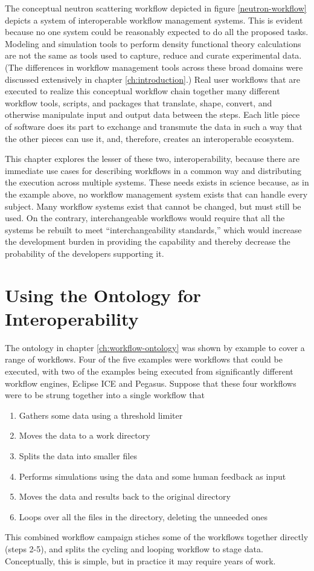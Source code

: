 The conceptual neutron scattering workflow depicted in figure
\ref{neutron-workflow} depicts a system of interoperable workflow management
systems. This is evident because no one system could be reasonably expected to
do all the proposed tasks. Modeling and simulation tools to perform density
functional theory calculations are not the same as tools used to capture, reduce
and curate experimental data. (The differences in workflow management tools
across these broad domains were discussed extensively in chapter
\ref{ch:introduction}.) Real user workflows that are executed to realize this
conceptual workflow chain together many different workflow tools, scripts, and
packages that translate, shape, convert, and otherwise manipulate input and
output data between the steps. Each litle piece of software does its part to
exchange and transmute the data in such a way that the other pieces can use it,
and, therefore, creates an interoperable ecosystem.

This chapter explores the lesser of these two, interoperability, because there
are immediate use cases for describing workflows in a common way and
distributing the execution across multiple systems. These needs exists in
science because, as in the example above, no workflow management system exists
that can handle every subject. Many workflow systems exist that cannot be
changed, but must still be used. On the contrary, interchangeable workflows
would require that all the systems be rebuilt to meet ``interchangeability
standards,'' which would increase the development burden in providing the
capability and thereby decrease the probability of the developers supporting
it.

\section{Using the Ontology for Interoperability}

The ontology in chapter \ref{ch:workflow-ontology} was shown by example to cover
a range of workflows. Four of the five examples were workflows that could be
executed, with two of the examples being executed from significantly different
workflow engines, Eclipse ICE and Pegasus. Suppose that these four workflows
were to be strung together into a single workflow that
\begin{enumerate}
  \item Gathers some data using a threshold limiter
  \item Moves the data to a work directory
  \item Splits the data into smaller files
  \item Performs simulations using the data and some human feedback as input
  \item Moves the data and results back to the original directory
  \item Loops over all the files in the directory, deleting the unneeded ones
\end{enumerate}
This combined workflow campaign stiches some of the workflows together directly
(steps 2-5), and splits the cycling and looping workflow to stage data.
Conceptually, this is simple, but in practice it may require years of work.

